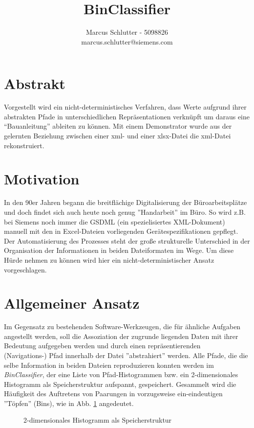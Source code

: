 \documentclass[a4paper,10pt]{article}
\title{BinClassifier}
\author{Marcus Schlutter - 5098826\\marcus.schlutter@siemens.com}
\begin{document}
\maketitle

\section{Abstrakt}
Vorgestellt wird ein nicht-deterministisches Verfahren, dass Werte aufgrund ihrer abstrakten Pfade in
unterschiedlichen Repräsentationen verknüpft um daraus eine ``Bauanleitung'' ableiten zu können. Mit
einem Demonstrator wurde aus der gelernten Beziehung zwischen einer xml- und einer xlsx-Datei die
xml-Datei rekonstruiert.

\section{Motivation}
\label{sec:motivation}
In den 90er Jahren begann die breitflächige Digitalisierung der Büroarbeitsplätze und doch findet sich auch
heute noch genug ''Handarbeit'' im Büro. So wird z.B. bei Siemens noch immer die GSDML (ein spezielisiertes
XML-Dokument) manuell mit den in Excel-Dateien vorliegenden Gerätespezifikationen gepflegt. Der
Automatisierung des Prozesses steht der große strukturelle Unterschied in der Organisation der Informationen
in beiden Dateiformaten im Wege. Um diese Hürde nehmen zu können wird hier ein nicht-deterministischer
Ansatz vorgeschlagen.

\section{Allgemeiner Ansatz}
\label{sec:approach}
Im Gegensatz zu bestehenden Software-Werkzeugen, die für ähnliche Aufgaben angestellt werden, soll die
Assoziation der zugrunde liegenden Daten mit ihrer Bedeutung aufgegeben werden und durch einen
repräsentierenden\\(Navigations-) Pfad innerhalb der Datei ''abstrahiert'' werden. Alle Pfade, die
die selbe Information in beiden Dateien reproduzieren konnten werden im \textit{BinClassifier}, der eine
Liste von Pfad-Histogrammen bzw. ein 2-dimensionales Histogramm als Speicherstruktur aufspannt, gespeichert.
Gesammelt wird die Häufigkeit des Auftretens von Paarungen in vorzugsweise ein-eindeutigen ''Töpfen''
(Bins), wie in Abb. \ref{classifier_table} angedeutet.

\begin{figure}[h]
 \centering
 \caption{2-dimensionales Histogramm als Speicherstruktur}
 \label{classifier_table}
\end{figure}
\end{document}
